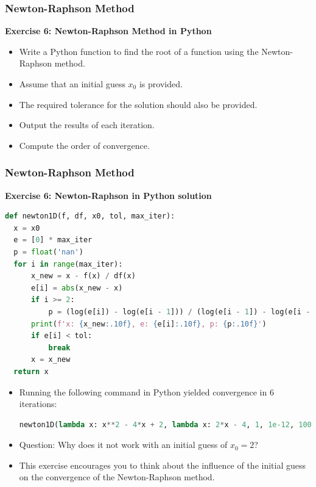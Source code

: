 \begin{frame}[fragile]
    \frametitle{Newton-Raphson Method}

    \textbf{Exercise 6: Newton-Raphson Method in Python}

    \begin{itemize}
        \item Write a Python function to find the root of a function using the Newton-Raphson method.
        \item Assume that an initial guess \(x_0\) is provided.
        \item The required tolerance for the solution should also be provided.
        \item Output the results of each iteration.
        \item Compute the order of convergence.
    \end{itemize}
\end{frame}

\begin{frame}[fragile]
  \frametitle{Newton-Raphson Method}
  
  \textbf{Exercise 6: Newton-Raphson in Python solution}

  \begin{lstlisting}[language=Python]
def newton1D(f, df, x0, tol, max_iter):
  x = x0
  e = [0] * max_iter
  p = float('nan')
  for i in range(max_iter):
      x_new = x - f(x) / df(x)
      e[i] = abs(x_new - x)
      if i >= 2:
          p = (log(e[i]) - log(e[i - 1])) / (log(e[i - 1]) - log(e[i - 2]))
      print(f'x: {x_new:.10f}, e: {e[i]:.10f}, p: {p:.10f}')
      if e[i] < tol:
          break
      x = x_new
  return x
  \end{lstlisting}
  \begin{itemize}
      \item Running the following command in Python yielded convergence in 6 iterations:
      \begin{lstlisting}[language=Python]
newton1D(lambda x: x**2 - 4*x + 2, lambda x: 2*x - 4, 1, 1e-12, 100)
      \end{lstlisting}
      \item Question: Why does it not work with an initial guess of \( x_0 = 2 \)?
      \item This exercise encourages you to think about the influence of the initial guess on the convergence of the Newton-Raphson method.
  \end{itemize}
\end{frame}


